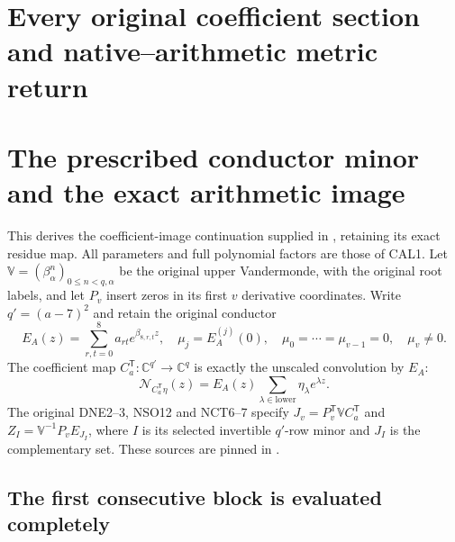 \endgroup

\clearpage
\begingroup


\setcounter{equation}{0}
\renewcommand{\theequation}{A03CM.\arabic{equation}}
\section*{Every original coefficient section and native--arithmetic metric return}
\section{The prescribed conductor minor and the exact arithmetic image}

This derives the coefficient-image continuation supplied in
\cite{a03cm:program:arrival03-01}, retaining its exact residue map.
All parameters and full polynomial factors are those of CAL1.
Let $\mathbb V=(\beta_\alpha^n)_{0\le n<q,\alpha}$ be the
original upper Vandermonde, with the original root labels, and let
$P_v$ insert zeros in its first $v$ derivative coordinates.
Write $q'=(a-7)^2$ and retain the original conductor
\[
 E_A(z)=\sum_{r,t=0}^8a_{rt}e^{\beta_{8,r,t}z},\quad
 \mu_j=E_A^{(j)}(0),\quad
 \mu_0=\cdots=\mu_{v-1}=0,\quad\mu_v\ne0.
 \tag{COI1}
\]
The coefficient map $C_a^{\mathsf T}:\mathbb C^{q'}\to\mathbb C^q$
is exactly the unscaled convolution by $E_A$:
\[
 \mathcal N_{C_a^{\mathsf T}\eta}(z)
       =E_A(z)\sum_{\lambda\in\mathrm{lower}}\eta_\lambda e^{\lambda z}.
 \tag{COI2}
\]
The original DNE2--3, NSO12 and NCT6--7 specify
$J_v=P_v^{\mathsf T}\mathbb VC_a^{\mathsf T}$ and
$Z_I=\mathbb V^{-1}P_vE_{J_I}$, where $I$ is its selected invertible
$q'$-row minor and $J_I$ is the complementary set. These sources are
pinned in \cite{a03cm:program:DNE,a03cm:program:NCT}.

\subsection{The first consecutive block is evaluated completely}

